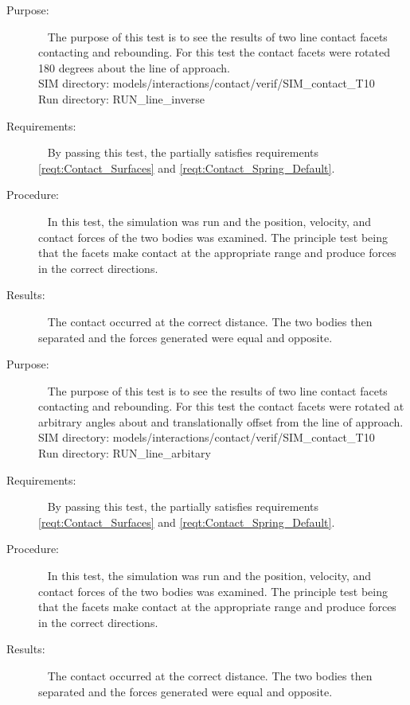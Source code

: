 \label{test:contact_05}
\begin{description}
\item[Purpose:] \ \newline
The purpose of this test is to see the results of two line contact facets contacting and rebounding. For this test the contact facets were rotated 180 degrees about the line of approach.\\
SIM directory: models/interactions/contact/verif/SIM\_contact\_T10\\
Run directory: RUN\_line\_inverse
\item[Requirements:] \ \newline
By passing this test, the \ModelDesc partially satisfies requirements \ref{reqt:Contact_Surfaces} and \ref{reqt:Contact_Spring_Default}.
\item[Procedure:]\ \newline
In this test, the simulation was run and the position, velocity, and contact forces of the two bodies was examined. The principle test being that the facets make contact at the appropriate range and produce forces in the correct directions.
\item[Results:]\ \newline
The contact occurred at the correct distance.  The two bodies then separated and the forces generated were equal and opposite.
\end{description}

\label{test:contact_06}
\begin{description}
\item[Purpose:] \ \newline
The purpose of this test is to see the results of two line contact facets contacting and rebounding. For this test the contact facets were rotated at arbitrary angles about and translationally offset from the line of approach.\\
SIM directory: models/interactions/contact/verif/SIM\_contact\_T10\\
Run directory: RUN\_line\_arbitary
\item[Requirements:] \ \newline
By passing this test, the \ModelDesc partially satisfies requirements \ref{reqt:Contact_Surfaces} and \ref{reqt:Contact_Spring_Default}.
\item[Procedure:]\ \newline
In this test, the simulation was run and the position, velocity, and contact forces of the two bodies was examined.
The principle test being that the facets make contact at the appropriate range and produce forces in the correct directions.
\item[Results:]\ \newline
The contact occurred at the correct distance.  The two bodies then separated and the forces generated were equal and opposite.
\end{description}

